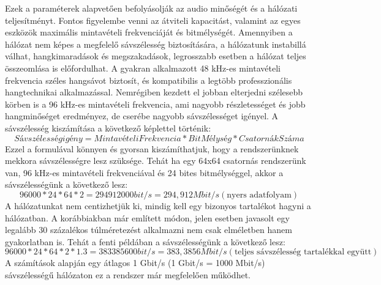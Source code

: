 Ezek a paraméterek alapvetően befolyásolják az audio minőségét és a hálózati teljesítményt.
Fontos figyelembe venni az átviteli kapacitást, valamint az egyes eszközök maximális mintavételi frekvenciáját és bitmélységét.
Amennyiben a hálózat nem képes a megfelelő sávszélesség biztosítására, a hálózatunk instabillá válhat, 
hangkimaradások és megszakadások, legrosszabb esetben a hálózat teljes összeomlása is előfordulhat.
A gyakran alkalmazott 48 kHz-es mintavételi frekvencia széles hangsávot biztosít, és kompatibilis a legtöbb
professzionális hangtechnikai alkalmazással. 
Nemrégiben kezdett el jobban elterjedni szélesebb körben is a 96 kHz-es mintavételi frekvencia, ami
nagyobb részletességet és jobb hangminőséget eredményez, de cserébe nagyobb sávszélességet igényel.
A sávszélesség kiszámítása a következő képlettel történik:
\begin{equation}
	\label{eq:sávszélesség}
	Sávszélesség igény = MintavételiFrekvencia * BitMélység * CsatornákSzáma
\end{equation}
Ezzel a formulával könnyen és gyorsan kiszámíthatjuk, hogy a rendszerünknek mekkora sávszélességre lesz szüksége.
Tehát ha egy 64x64 csatornás rendszerünk van, 96 kHz-es mintavételi frekvenciával és 24 bites bitmélységgel,
akkor a sávszélességünk a következő lesz:
\begin{equation}
	\label{eq:sávszélesség}
	96000 * 24 * 64 * 2 = 294912000 bit/s = 294,912 Mbit/s (\text{nyers adatfolyam})
\end{equation}
A hálózatunkat nem centizhetjük ki, mindig kell egy bizonyos tartalékot hagyni a hálózatban. A korábbiakban már említett módon,
jelen esetben javasolt egy legalább 30 százalékos túlméretezést alkalmazni nem csak elméletben hanem gyakorlatban is. 
Tehát a fenti példában a sávszélességünk a következő lesz:
\begin{equation}
	\label{eq:teljes-sávszélesség}
	96000 * 24 * 64 * 2 * 1.3 = 383385600 bit/s = 383,3856 Mbit/s (\text{teljes sávszélesség tartalékkal együtt})
\end{equation}
A számítások alapján egy átlagos 1 Gbit/s (1 Gbit/s = 1000 Mbit/s) sávszélességű hálózaton ez a rendszer már megfelelően működhet.
